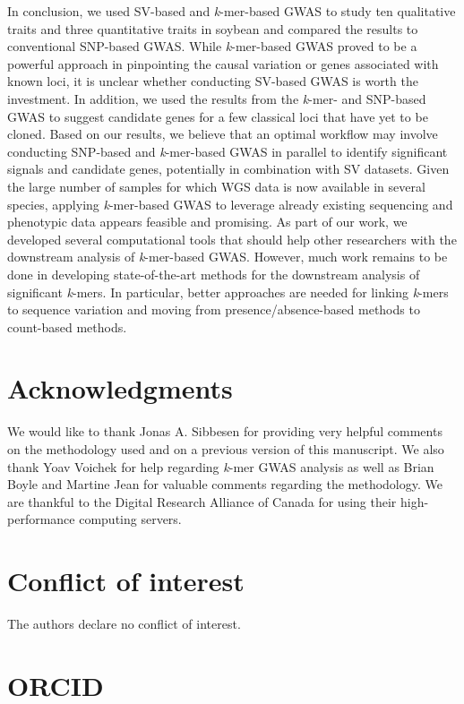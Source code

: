 \documentclass{article}
\begin{document}
In conclusion, we used SV-based and \emph{k}-mer-based GWAS to study ten
qualitative traits and three quantitative traits in soybean and
compared the results to conventional SNP-based GWAS. While \emph{k}-mer-based
GWAS proved to be a powerful approach in pinpointing the causal variation or
genes associated with known loci, it is unclear whether conducting SV-based
GWAS is worth the investment. In addition, we used the results from the
\emph{k}-mer- and SNP-based GWAS to suggest candidate genes for a few classical
loci that have yet to be cloned. Based on our results, we believe that an
optimal workflow may involve conducting SNP-based and \emph{k}-mer-based GWAS
in parallel to identify significant signals and candidate genes, potentially in
combination with SV datasets. Given the large number of samples for which WGS
data is now available in several species, applying \emph{k}-mer-based GWAS to
leverage already existing sequencing and phenotypic data appears feasible and
promising.  As part of our work, we developed several computational tools that
should help other researchers with the downstream analysis of
\emph{k}-mer-based GWAS. However, much work remains to be done in
developing state-of-the-art methods for the downstream analysis of significant
\emph{k}-mers. In particular, better approaches are needed for linking
\emph{k}-mers to sequence variation and moving from presence/absence-based
methods to count-based methods.

\clearpage

\section*{Acknowledgments}

We would like to thank Jonas A. Sibbesen for providing very helpful comments
on the methodology used and on a previous version of this manuscript.
We also thank Yoav Voichek for help regarding \textit{k}-mer GWAS
analysis as well as Brian Boyle and Martine Jean for valuable comments
regarding the methodology. We are thankful to the Digital Research Alliance of
Canada for using their high-performance computing servers.

\section*{Conflict of interest}
The authors declare no conflict of interest.

\section*{ORCID}
\end{document}
